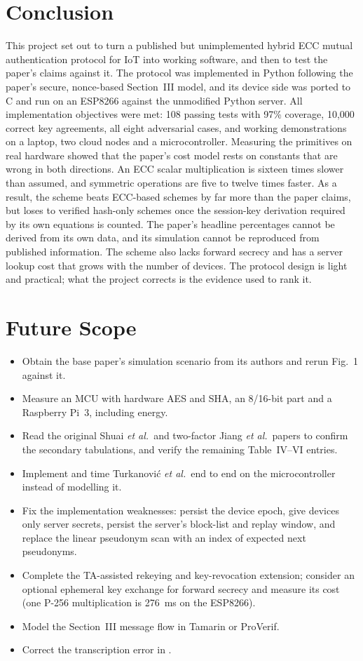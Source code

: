 \documentclass[12pt,a4paper,oneside]{report}
\numberwithin{equation}{chapter}
\begin{document}
\section{Conclusion}
This project set out to turn a published but unimplemented hybrid ECC mutual authentication protocol for IoT into working software, and then to test the paper's claims against it. The protocol was implemented in Python following the paper's secure, nonce-based Section~III model, and its device side was ported to C and run on an ESP8266 against the unmodified Python server. All implementation objectives were met: 108 passing tests with 97\% coverage, 10{,}000 correct key agreements, all eight adversarial cases, and working demonstrations on a laptop, two cloud nodes and a microcontroller. Measuring the primitives on real hardware showed that the paper's cost model rests on constants that are wrong in both directions. An ECC scalar multiplication is sixteen times slower than assumed, and symmetric operations are five to twelve times faster. As a result, the scheme beats ECC-based schemes by far more than the paper claims, but loses to verified hash-only schemes once the session-key derivation required by its own equations is counted. The paper's headline percentages cannot be derived from its own data, and its simulation cannot be reproduced from published information. The scheme also lacks forward secrecy and has a server lookup cost that grows with the number of devices. The protocol design is light and practical; what the project corrects is the evidence used to rank it.

\section{Future Scope}
\begin{itemize}
  \item Obtain the base paper's simulation scenario from its authors and rerun Fig.~1 against it.
  \item Measure an MCU with hardware AES and SHA, an 8/16-bit part and a Raspberry Pi~3, including energy.
  \item Read the original Shuai \emph{et al.}\ and two-factor Jiang \emph{et al.}\ papers to confirm the secondary tabulations, and verify the remaining Table~IV--VI entries.
  \item Implement and time Turkanovi\'{c} \emph{et al.}\ end to end on the microcontroller instead of modelling it.
  \item Fix the implementation weaknesses: persist the device epoch, give devices only server secrets, persist the server's block-list and replay window, and replace the linear pseudonym scan with an index of expected next pseudonyms.
  \item Complete the TA-assisted rekeying and key-revocation extension; consider an optional ephemeral key exchange for forward secrecy and measure its cost (one P-256 multiplication is 276~ms on the ESP8266).
  \item Model the Section~III message flow in Tamarin or ProVerif.
  \item Correct the transcription error in .
\end{itemize}
\end{document}
